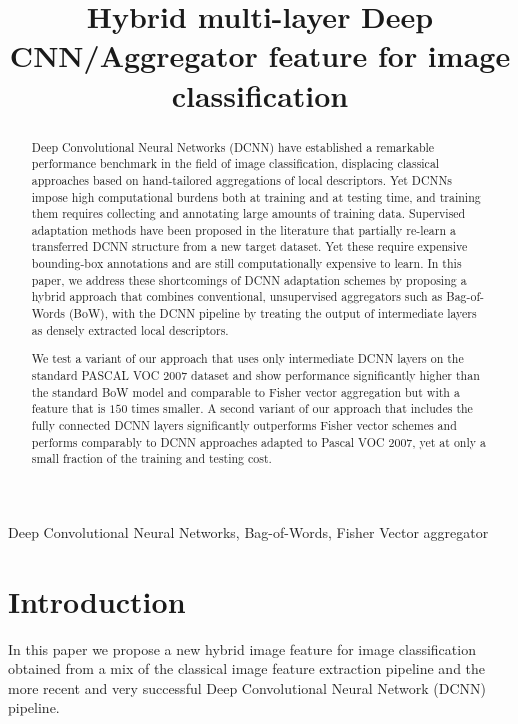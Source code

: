 \documentclass{article}
\title{Hybrid multi-layer Deep CNN/Aggregator feature for image classification}
\begin{document}
\maketitle
\begin{abstract}
Deep Convolutional Neural Networks (DCNN) have established a remarkable performance benchmark in the field of image classification, displacing classical approaches based on hand-tailored aggregations of local descriptors. Yet DCNNs impose high computational burdens both at training and at testing time, and training them requires collecting and annotating large amounts of training data. Supervised adaptation methods have been proposed in the literature that partially re-learn a transferred DCNN structure from a new target dataset. Yet these require expensive bounding-box annotations and are still computationally expensive to learn.  In this paper, we address these shortcomings of DCNN adaptation schemes by proposing a hybrid approach that combines conventional, unsupervised aggregators such as Bag-of-Words (BoW), with the DCNN pipeline by treating the output of intermediate layers as densely extracted local descriptors.

We test a variant of our approach that uses only intermediate DCNN layers on the standard PASCAL VOC 2007 dataset and show performance significantly higher than the standard BoW model and comparable to Fisher vector aggregation but with a feature that is $150$ times smaller. A second variant of our approach that includes the fully connected DCNN layers significantly outperforms Fisher vector schemes and performs comparably to DCNN approaches adapted to Pascal VOC 2007, yet at only a small fraction of the training and testing cost.
\end{abstract}

\begin{keywords}
Deep Convolutional Neural Networks, Bag-of-Words, Fisher Vector aggregator
\end{keywords}



\section{Introduction}
In this paper we propose a new hybrid image feature for image classification obtained from a mix of the classical image feature extraction pipeline and the more recent and very successful Deep Convolutional Neural Network (DCNN) pipeline. 
\end{document}
